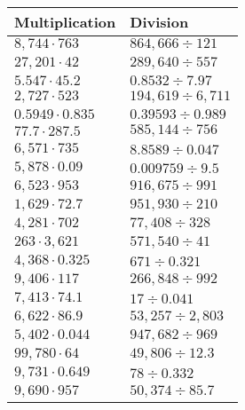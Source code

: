 \begin{longtable}[]{@{}ll@{}}
\toprule
Multiplication & Division\tabularnewline
\midrule
\endhead
\(8,744\cdot763\) & \(864,666÷121\)\tabularnewline
\(27,201\cdot42\) & \(289,640÷557\)\tabularnewline
\(5.547\cdot45.2\) & \(0.8532÷7.97\)\tabularnewline
\(2,727\cdot523\) & \(194,619÷6,711\)\tabularnewline
\(0.5949\cdot0.835\) & \(0.39593÷0.989\)\tabularnewline
\(77.7\cdot287.5\) & \(585,144÷756\)\tabularnewline
\(6,571\cdot735\) & \(8.8589÷0.047\)\tabularnewline
\(5,878\cdot0.09\) & \(0.009759÷9.5\)\tabularnewline
\(6,523\cdot953\) & \(916,675÷991\)\tabularnewline
\(1,629\cdot72.7\) & \(951,930÷210\)\tabularnewline
\(4,281\cdot702\) & \(77,408÷328\)\tabularnewline
\(263\cdot3,621\) & \(571,540÷41\)\tabularnewline
\(4,368\cdot0.325\) & \(671÷0.321\)\tabularnewline
\(9,406\cdot117\) & \(266,848÷992\)\tabularnewline
\(7,413\cdot74.1\) & \(17÷0.041\)\tabularnewline
\(6,622\cdot86.9\) & \(53,257÷2,803\)\tabularnewline
\(5,402\cdot0.044\) & \(947,682÷969\)\tabularnewline
\(99,780\cdot64\) & \(49,806÷12.3\)\tabularnewline
\(9,731\cdot0.649\) & \(78÷0.332\)\tabularnewline
\(9,690\cdot957\) & \(50,374÷85.7\)\tabularnewline
\bottomrule
\end{longtable}
